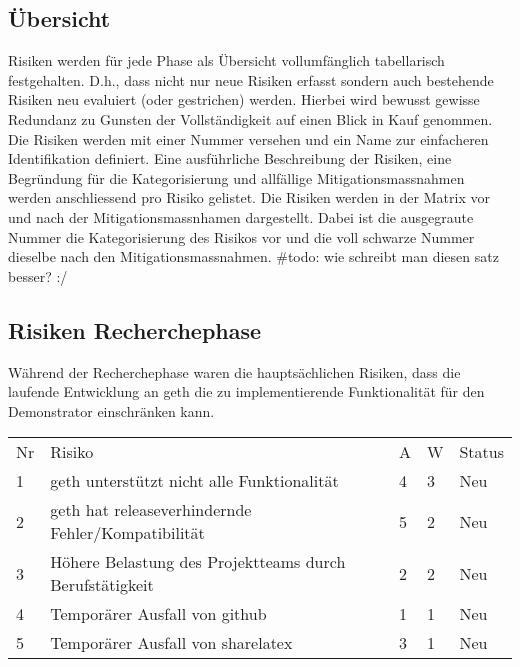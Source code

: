 \subsection{Übersicht}
Risiken werden für jede Phase als Übersicht vollumfänglich tabellarisch festgehalten. D.h., dass nicht nur neue Risiken erfasst sondern auch bestehende Risiken neu evaluiert (oder gestrichen) werden. Hierbei wird bewusst gewisse Redundanz zu Gunsten der Vollständigkeit auf einen Blick in Kauf genommen. Die Risiken werden mit einer Nummer versehen und ein Name zur einfacheren Identifikation definiert. Eine ausführliche Beschreibung der Risiken, eine Begründung für die Kategorisierung und allfällige Mitigationsmassnahmen werden anschliessend pro Risiko gelistet. Die Risiken werden in der Matrix vor und nach der Mitigationsmassnhamen dargestellt. Dabei ist die ausgegraute Nummer die Kategorisierung des Risikos vor und die voll schwarze Nummer dieselbe nach den Mitigationsmassnahmen. \#todo: wie schreibt man diesen satz besser? :/

\subsection{Risiken Recherchephase}
Während der Recherchephase waren die hauptsächlichen Risiken, dass die laufende Entwicklung an geth die zu implementierende Funktionalität für den Demonstrator einschränken kann.

\begin{table}[]
\centering
\begin{tabular}{lllll}
Nr & Risiko                                                  & A & W & Status \\
1  & geth unterstützt nicht alle Funktionalität              & 4          & 3                  & Neu    \\
2  & geth hat releaseverhindernde Fehler/Kompatibilität      & 5          & 2                  & Neu    \\
3  & Höhere Belastung des Projektteams durch Berufstätigkeit & 2          & 2                  & Neu    \\
4  & Temporärer Ausfall von github                           & 1          & 1                  & Neu    \\
5  & Temporärer Ausfall von sharelatex                       & 3          & 1                  & Neu   
\end{tabular}
\end{table}

